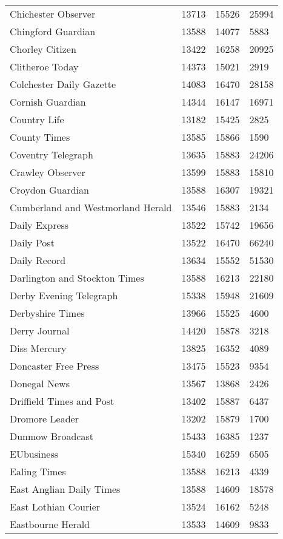 \begin{longtable}{p{}p{}p{}p{}}
  Chichester Observer & 13713 & 15526 & 25994 \\ 
  Chingford Guardian & 13588 & 14077 & 5883 \\ 
  Chorley Citizen & 13422 & 16258 & 20925 \\ 
  Clitheroe Today & 14373 & 15021 & 2919 \\ 
  Colchester Daily Gazette & 14083 & 16470 & 28158 \\ 
  Cornish Guardian & 14344 & 16147 & 16971 \\ 
  Country Life & 13182 & 15425 & 2825 \\ 
  County Times & 13585 & 15866 & 1590 \\ 
  Coventry Telegraph & 13635 & 15883 & 24206 \\ 
  Crawley Observer & 13599 & 15883 & 15810 \\ 
  Croydon Guardian & 13588 & 16307 & 19321 \\ 
  Cumberland and Westmorland Herald & 13546 & 15883 & 2134 \\ 
  Daily Express & 13522 & 15742 & 19656 \\ 
  Daily Post & 13522 & 16470 & 66240 \\ 
  Daily Record & 13634 & 15552 & 51530 \\ 
  Darlington and Stockton Times & 13588 & 16213 & 22180 \\ 
  Derby Evening Telegraph & 15338 & 15948 & 21609 \\ 
  Derbyshire Times & 13966 & 15525 & 4600 \\ 
  Derry Journal & 14420 & 15878 & 3218 \\ 
  Diss Mercury & 13825 & 16352 & 4089 \\ 
  Doncaster Free Press & 13475 & 15523 & 9354 \\ 
  Donegal News & 13567 & 13868 & 2426 \\ 
  Driffield Times and Post & 13402 & 15887 & 6437 \\ 
  Dromore Leader & 13202 & 15879 & 1700 \\ 
  Dunmow Broadcast & 15433 & 16385 & 1237 \\ 
  EUbusiness & 15340 & 16259 & 6505 \\ 
  Ealing Times & 13588 & 16213 & 4339 \\ 
  East Anglian Daily Times & 13588 & 14609 & 18578 \\ 
  East Lothian Courier & 13524 & 16162 & 5248 \\ 
  Eastbourne Herald & 13533 & 14609 & 9833 \\ 

\end{longtable}
